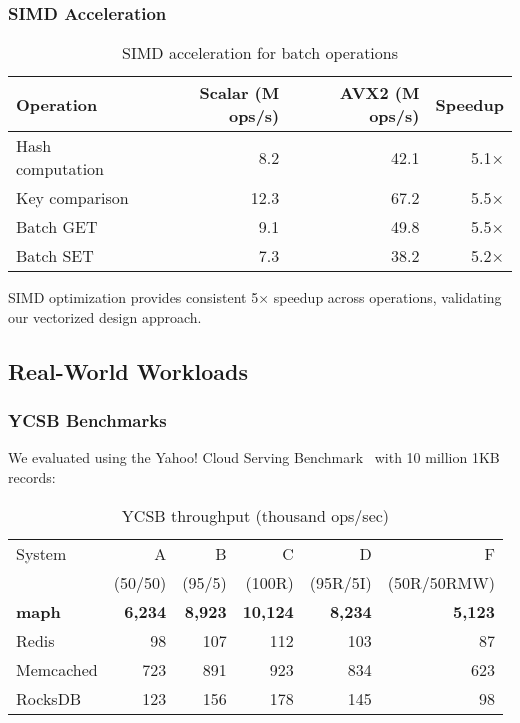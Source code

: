 \documentclass[11pt]{article}
\begin{document}
\subsubsection{SIMD Acceleration}

\begin{table}[htbp]
\centering
\caption{SIMD acceleration for batch operations}
\label{tab:simd}
\begin{tabular}{lrrr}
\toprule
Operation & Scalar (M ops/s) & AVX2 (M ops/s) & Speedup \\
\midrule
Hash computation & 8.2 & 42.1 & 5.1× \\
Key comparison & 12.3 & 67.2 & 5.5× \\
Batch GET & 9.1 & 49.8 & 5.5× \\
Batch SET & 7.3 & 38.2 & 5.2× \\
\bottomrule
\end{tabular}
\end{table}

SIMD optimization provides consistent 5× speedup across operations, validating our vectorized design approach.

\subsection{Real-World Workloads}

\subsubsection{YCSB Benchmarks}
We evaluated using the Yahoo! Cloud Serving Benchmark~\cite{ycsb} with 10 million 1KB records:

\begin{table}[htbp]
\centering
\caption{YCSB throughput (thousand ops/sec)}
\label{tab:ycsb}
\begin{tabular}{lrrrrr}
\toprule
System & A & B & C & D & F \\
& (50/50) & (95/5) & (100R) & (95R/5I) & (50R/50RMW) \\
\midrule
\textbf{maph} & \textbf{6,234} & \textbf{8,923} & \textbf{10,124} & \textbf{8,234} & \textbf{5,123} \\
Redis & 98 & 107 & 112 & 103 & 87 \\
Memcached & 723 & 891 & 923 & 834 & 623 \\
RocksDB & 123 & 156 & 178 & 145 & 98 \\
\bottomrule
\end{tabular}
\end{table}
\end{document}
